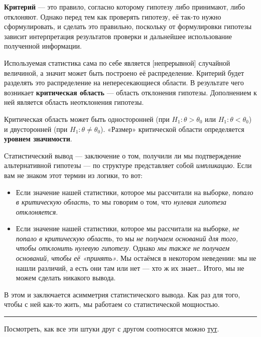 \documentclass[
  letterpaper,
]{scrbook}
\providecommand{\tightlist}{%
  \setlength{\itemsep}{0pt}\setlength{\parskip}{0pt}}\usepackage{longtable,booktabs,array}
\theoremstyle{definition}
\theoremstyle{remark}
\begin{document}
\textbf{Критерий} --- это правило, согласно которому гипотезу либо
принимают, либо отклоняют. Однако перед тем как проверять гипотезу, её
так-то нужно сформулировать, и сделать это правильно, поскольку от
формулировки гипотезы зависит интерпретация результатов проверки и
дальнейшее использование полученной информации.

Используемая статистика сама по себе является {[}непрерывной{]}
случайной величиной, а значит может быть построено её распределение.
Критерий будет разделять это распределение на непересекающиеся области.
В результате чего возникает \textbf{критическая область} --- область
отклонения гипотезы. Дополнением к ней является область неотклонения
гипотезы.

Критическая область может быть односторонней (при
\(H_1:\theta > \theta_0\) или \(H_1: \theta < \theta_0\)) и двусторонней
(при \(H_1:\theta \neq \theta_0\)). «Размер» критической области
определяется \textbf{уровнем значимости}.

Статистический вывод --- заключение о том, получили ли мы подтверждение
альтернативной гипотезы --- по структуре представляет собой
\emph{импликацию}. Если вам не знаком этот термин из логики, то вот:

\begin{itemize}
\tightlist
\item
  Если значение нашей статистики, которое мы рассчитали на выборке,
  \emph{попало в критическую область}, то мы говорим о том, что
  \emph{нулевая гипотеза отклоняется}.
\item
  Если значение нашей статистики, которое мы рассчитали на выборке,
  \emph{не попало в критическую область}, то мы \emph{не получаем
  оснований для того, чтобы отклонить нулевую гипотезу}. Однако \emph{мы
  также не получаем оснований, чтобы её «принять»}. Мы остаёмся в
  некотором неведении: мы не нашли различий, а есть они там или нет ---
  хто ж их знает\ldots{} Итого, мы не можем сделать никакого вывода.
\end{itemize}

В этом и заключается асимметрия статистического вывода. Как раз для
того, чтобы с ней как-то жить, мы работаем со статистической мощностью.

\begin{center}\rule{0.5\linewidth}{0.5pt}\end{center}

Посмотреть, как все эти штуки друг с другом соотносятся можно
\href{https://rpsychologist.com/d3/nhst/}{тут}.
\end{document}
